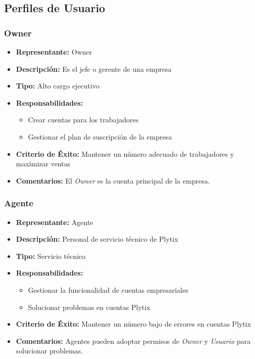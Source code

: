 \documentclass{article}
\begin{document}
\subsection{Perfiles de Usuario}

\subsubsection{Owner}

\begin{itemize}
    \item \textbf{Representante:} Owner
    \item \textbf{Descripción:} Es el jefe o gerente de una empresa
    \item \textbf{Tipo:} Alto cargo ejecutivo
    \item \textbf{Responsabilidades:}
    \begin{itemize}
        \item Crear cuentas para los trabajadores
        \item Gestionar el plan de suscripción de la empresa
    \end{itemize}
    \item \textbf{Criterio de Éxito:} Mantener un número adecuado de trabajadores y maximizar ventas
    \item \textbf{Comentarios:} El \textit{Owner} es la cuenta principal de la empresa.
\end{itemize}

\subsubsection{Agente}

\begin{itemize}
    \item \textbf{Representante:} Agente
    \item \textbf{Descripción:} Personal de servicio técnico de Plytix
    \item \textbf{Tipo:} Servicio técnico
    \item \textbf{Responsabilidades:}
    \begin{itemize}
        \item Gestionar la funcionalidad de cuentas empresariales
        \item Solucionar problemas en cuentas Plytix
    \end{itemize}
    \item \textbf{Criterio de Éxito:} Mantener un número bajo de errores en cuentas Plytix
    \item \textbf{Comentarios:} Agentes pueden adoptar permisos de \textit{Owner} y \textit{Usuario} para solucionar problemas.
\end{itemize}
\end{document}
